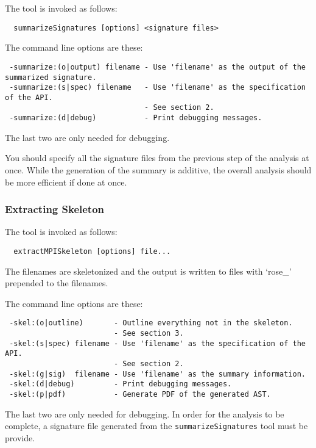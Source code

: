 \documentclass{article}
\begin{document}
The tool is invoked as follows:
\begin{verbatim}
  summarizeSignatures [options] <signature files>
\end{verbatim}

The command line options are these:

\begin{verbatim}
 -summarize:(o|output) filename - Use 'filename' as the output of the summarized signature.
 -summarize:(s|spec) filename   - Use 'filename' as the specification of the API.
                                - See section 2.
 -summarize:(d|debug)           - Print debugging messages.
\end{verbatim}

The last two are only needed for debugging.

You should specify all the signature files from the previous step of the
analysis at once. While the generation of the summary is additive, the overall
analysis should be more efficient if done at once.


\subsubsection{Extracting Skeleton}

The tool is invoked as follows:

\begin{verbatim}
  extractMPISkeleton [options] file...
\end{verbatim}

The filenames are skeletonized and the output is written to files with `rose\_'
prepended to the filenames.

The command line options are these:

\begin{verbatim}
 -skel:(o|outline)       - Outline everything not in the skeleton.
                         - See section 3.
 -skel:(s|spec) filename - Use 'filename' as the specification of the API.
                         - See section 2.
 -skel:(g|sig)  filename - Use 'filename' as the summary information.
 -skel:(d|debug)         - Print debugging messages.
 -skel:(p|pdf)           - Generate PDF of the generated AST.
\end{verbatim}

The last two are only needed for debugging. In order for the analysis to be
complete, a signature file generated from the \verb|summarizeSignatures| tool
must be provide.
\end{document}
